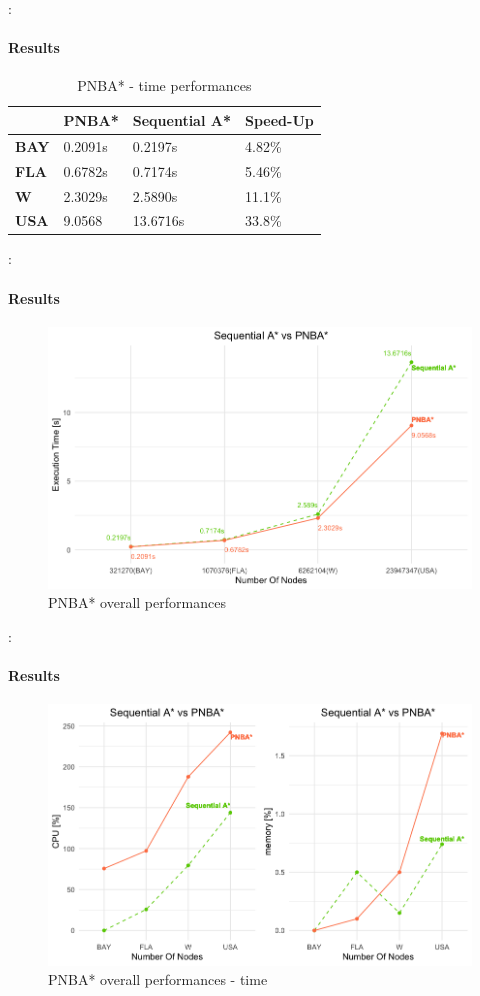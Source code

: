\documentclass[12pt]{beamer}
\begin{document}
	\begin{frame}{\secname : \subsecname}
		\framesubtitle{Results}
		\begin{table}[ht!]
			\centering
			\caption{PNBA* - time performances}
			\begin{tabular}{|l|l|l|l|}
			\hline
			\textbf{}    & \textbf{PNBA*} & \textbf{Sequential A*} & \textbf{Speed-Up} \\ \hline
			\textbf{BAY} & 0.2091s        & 0.2197s                & 4.82\%            \\ \hline
			\textbf{FLA} & 0.6782s        & 0.7174s                & 5.46\%            \\ \hline
			\textbf{W}   & 2.3029s        & 2.5890s                & 11.1\%            \\ \hline
			\textbf{USA} & 9.0568         & 13.6716s               & 33.8\%            \\ \hline
			\end{tabular}
		  \end{table}
	\end{frame}
	\begin{frame}{\secname : \subsecname}
		\framesubtitle{Results}
		\begin{figure}[ht!]
			\centering
			\includegraphics[width=0.85\linewidth]{pnba/pnba_time.png}
			\caption{PNBA* overall performances}
		  \end{figure}
	\end{frame}
	\begin{frame}{\secname : \subsecname}
		\framesubtitle{Results}
		\begin{figure}[ht!]
			\centering
			\includegraphics[width=0.85\linewidth]{pnba/pnba_cpumem.png}
			\caption{PNBA* overall performances - time}
		  \end{figure}
	\end{frame}
\end{document}
